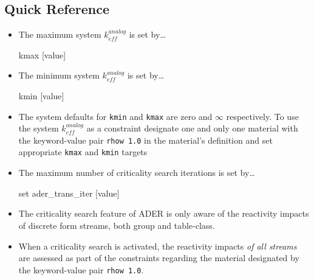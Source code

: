 \subsection{Quick Reference}\label{sec:reactivity_control_qr}
\begin{itemize}
\item{The maximum system $k_{eff}^{analog}$ is set by\ldots
\begin{lt}
kmax [value]
\end{lt}
    }
\item{The minimum system $k_{eff}^{analog}$ is set by\ldots
\begin{lt}
kmin [value]
\end{lt}
    }
\item{The system defaults for \texttt{kmin} and \texttt{kmax} are zero and 
$\infty$ respectively. To use the system $k_{eff}^{analog}$ as a constraint
designate one and only one material with the keyword-value pair 
\texttt{rhow 1.0} in the material's definition and set appropriate
\texttt{kmax} and \texttt{kmin} targets}
\item{The maximum number of criticality search iterations is set by\ldots
\begin{lt}
set ader_trans_iter [value]
\end{lt}
    }
\item{The criticality search feature of ADER is only aware of the reactivity
impacts of discrete form streams, both group and table-class.}
\item{When a criticality search is activated, the reactivity impacts \textit{of
all streams} are assessed as part of the constraints regarding the material
designated by the keyword-value pair \texttt{rhow 1.0}.} 
\end{itemize}

